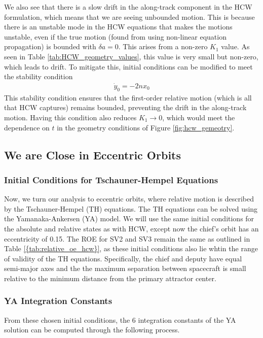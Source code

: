 We also see that there is a slow drift in the along-track component in the HCW formulation, which means that we are seeing unbounded motion. This is because there is an unstable mode in the HCW equations that makes the motions unstable, even if the true motion (found from using non-linear equation propagation) is bounded with $\delta a  =0$. This arises from a non-zero $K_1$ value. As seen in Table \ref{tab:HCW_geometry_values}, this value is very small but non-zero, which leads to drift. To mitigate this, initial conditions can be modified to meet the stability condition
\begin{align}
    \dot{y}_0 = -2nx_0
\end{align}
This stability condition ensures that the first-order relative motion (which is all that HCW captures) remains bounded, preventing the drift in the along-track motion. Having this condition also reduces $K_1 \rightarrow 0$, which would meet the dependence on $t$ in the geometry conditions of Figure \ref{fig:hcw_gemeotry}.

\newpage

\subsection{We are Close in Eccentric Orbits}
\subsubsection{Initial Conditions for Tschauner-Hempel Equations}
Now, we turn our analysis to eccentric orbits, where relative motion is described by the Tschauner-Hempel (TH) equations. The TH equations can be solved using the Yamanaka-Ankersen (YA) model. We will use the same initial conditions for the absolute and relative states as with HCW, except now the chief's orbit has an eccentricity of 0.15. The ROE for SV2 and SV3 remain the same as outlined in Table \ref{{tab:relative_oe_hcw}}, as these initial conditions also lie whtin the range of validity of the TH equations. Specifically, the chief and deputy have equal semi-major axes and the the maximum separation between spacecraft is small relative to the minimum distance from the primary attractor center. 

\subsubsection{YA Integration Constants}
From these chosen initial conditions, the 6 integration constants of the YA solution can be computed through the following process.

